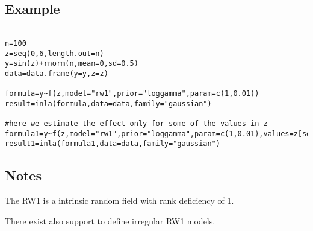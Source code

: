 \documentclass[a4paper,11pt]{article}
\begin{document}
\subsection*{Example}

\begin{verbatim}

n=100
z=seq(0,6,length.out=n)
y=sin(z)+rnorm(n,mean=0,sd=0.5)
data=data.frame(y=y,z=z)

formula=y~f(z,model="rw1",prior="loggamma",param=c(1,0.01))
result=inla(formula,data=data,family="gaussian")

#here we estimate the effect only for some of the values in z
formula1=y~f(z,model="rw1",prior="loggamma",param=c(1,0.01),values=z[seq(1,length(z),2)])
result1=inla(formula1,data=data,family="gaussian")

\end{verbatim}


\subsection*{Notes}

The RW1 is a intrinsic random field with rank deficiency of 1.

There exist also support to define irregular RW1 models. 
\end{document}
